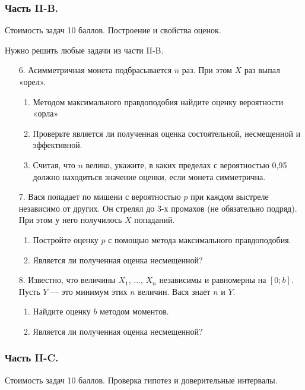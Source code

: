 \subsubsection*{Часть II-B.}

Стоимость задач 10 баллов. Построение и свойства оценок.

Нужно решить любые \textbf{} задачи из части II-B.

\begin{enumerate}
\item[6.] Асимметричная монета подбрасывается $n$ раз. При этом $X$ раз выпал «орел».
\begin{enumerate}
\item Методом максимального правдоподобия найдите оценку вероятности «орла»
\item Проверьте является ли полученная оценка состоятельной, несмещенной и эффективной.
\item Считая, что $n$ велико, укажите, в каких пределах с вероятностью 0,95 должно находиться значение оценки, если монета симметрична.
\end{enumerate}

\item[7.] Вася попадает по мишени с вероятностью $p$ при каждом выстреле независимо от других. Он стрелял до 3-х промахов (не обязательно подряд). При этом у него получилось $X$ попаданий.
\begin{enumerate}
\item Постройте оценку $p$ с помощью метода максимального правдоподобия.
\item Является ли полученная оценка несмещенной?
\end{enumerate}

\item[8.] Известно, что величины $X_{1}$, ..., $X_{n}$ независимы и равномерны на $[0;b]$. Пусть $Y$ — это минимум этих $n$ величин. Вася знает $n$ и $Y$.
\begin{enumerate}
\item Найдите оценку $b$ методом моментов.
\item Является ли полученная оценка несмещенной?
\end{enumerate}
\end{enumerate}

\subsubsection*{Часть II-C.}

Стоимость задач 10 баллов. Проверка гипотез и доверительные интервалы.

